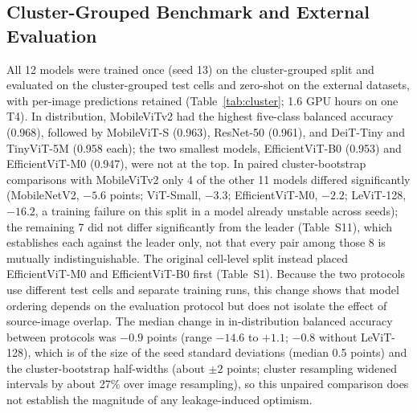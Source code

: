 \documentclass[12pt,letterpaper]{article}
\begin{document}
\subsection{Cluster-Grouped Benchmark and External Evaluation}
\label{sec:bench}
\label{sec:cluster}
\label{sec:shiftresults}
All 12 models were trained once (seed 13) on the cluster-grouped split and evaluated on the cluster-grouped test cells and zero-shot on the external datasets, with per-image predictions retained (Table~\ref{tab:cluster}; 1.6 GPU hours on one T4). In distribution, MobileViTv2 had the highest five-class balanced accuracy (0.968), followed by MobileViT-S (0.963), ResNet-50 (0.961), and DeiT-Tiny and TinyViT-5M (0.958 each); the two smallest models, EfficientViT-B0 (0.953) and EfficientViT-M0 (0.947), were not at the top. In paired cluster-bootstrap comparisons with MobileViTv2 only 4 of the other 11 models differed significantly (MobileNetV2, $-5.6$ points; ViT-Small, $-3.3$; EfficientViT-M0, $-2.2$; LeViT-128, $-16.2$, a training failure on this split in a model already unstable across seeds); the remaining 7 did not differ significantly from the leader (Table~S11), which establishes each against the leader only, not that every pair among those 8 is mutually indistinguishable. The original cell-level split instead placed EfficientViT-M0 and EfficientViT-B0 first (Table~S1). Because the two protocols use different test cells and separate training runs, this change shows that model ordering depends on the evaluation protocol but does not isolate the effect of source-image overlap. The median change in in-distribution balanced accuracy between protocols was $-0.9$ points (range $-14.6$ to $+1.1$; $-0.8$ without LeViT-128), which is of the size of the seed standard deviations (median 0.5 points) and the cluster-bootstrap half-widths (about $\pm2$ points; cluster resampling widened intervals by about 27\% over image resampling), so this unpaired comparison does not establish the magnitude of any leakage-induced optimism.
\end{document}
